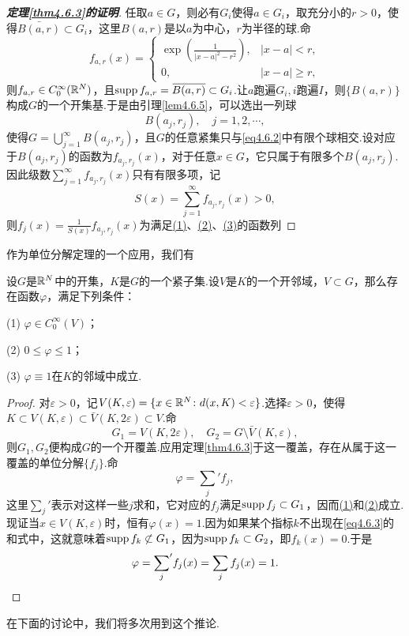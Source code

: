 \begin{proof}[\textbf{定理\ref{thm4.6.3}的证明}]
	任取$a\in G$，则必有$G_i$使得$a\in G_i$，取充分小的$r>0$，使得$\bar{B(a,r)}\subset G_i$，这里$B(a,r)$是以$a$为中心，$r$为半径的球.命
	\[f_{a,r}(x)=\begin{cases}
		\exp\left(\frac1{|x-a|^2-r^2}\right), & |x-a|<r,\\
		0, & |x-a|\ge r,
	\end{cases}\]
则$f_{a,r}\in C_0^\infty(\mathbb R^N)$，且$\operatorname{supp} f_{a,r}={}\mkern1mu\overline{\mkern-1muB(a,r)}\subset G_i$.让$a$跑遍$G_i,i$跑遍$I$，则$\{B(a,r)\}$构成$G$的一个开集基.于是由引理\ref{lem4.6.5}，可以选出一列球
\begin{equation}\label{eq4.6.2}
	B(a_j,r_j),\quad j=1,2,\cdots,
\end{equation}
使得$G=\bigcup\limits_{j=1}^\infty B(a_j,r_j)$，且$G$的任意紧集只与\eqref{eq4.6.2}中有限个球相交.设对应于$B(a_j,r_j)$的函数为$f_{a_j,r_j}(x)$，对于任意$x\in G$，它只属于有限多个$B(a_j,r_j)$.因此级数$\sum\limits_{j=1}^\infty f_{a_j,r_j}(x)$只有有限多项，记
\[S(x)=\sum_{j=1}^{\infty}f_{a_j,r_j}(x)>0,\]
则$f_j(x)=\frac1{S(x)}f_{a_j,r_j}(x)$为满足\hyperlink{4.6.3}{(1)}、\hyperlink{4.6.3}{(2)}、\hyperlink{4.6.3}{(3)}的函数列
\end{proof}
作为单位分解定理的一个应用，我们有
\begin{corollary}\label{cor4.6.6}
	设$G$是$\mathbb R^N$中的开集，$K$是$G$的一个紧子集.设$V$是$K$的一个开邻域，$V\subset G$，那么存在函数$\varphi$，满足下列条件：
	
	(1)\hypertarget{4.6.6}{}
	$\varphi\in C_0^\infty(V)$；
	
	(2)\hypertarget{4.6.6}{}
	$0\le\varphi\le1$；
	
	(3)\hypertarget{4.6.6}{}
	$\varphi\equiv1$在$K$的邻域中成立.
\end{corollary}
\begin{proof}
	对$\varepsilon>0$，记$V(K,\varepsilon)=\{x\in\mathbb R^N\colon d(x,K)<\varepsilon\}$.选择$\varepsilon>0$，使得$K\subset V(K,\varepsilon)\subset\bar{V}(K,2\varepsilon)\subset V$.命
	\[G_1=V(K,2\varepsilon),\quad G_2=G\setminus\bar{V}(K,\varepsilon),\]
	则$G_1,G_2$便构成$G$的一个开覆盖.应用定理\ref{thm4.6.3}于这一覆盖，存在从属于这一覆盖的单位分解$\{f_j\}$.命
	\begin{equation}\label{eq4.6.3}
		\varphi={\sum_j}'f_j,
	\end{equation}
这里${\sum\limits_{j}}'$表示对这样一些$j$求和，它对应的$f_j$满足$\operatorname{supp} f_j\subset G_1$，因而\hyperlink{4.6.6}{(1)}和\hyperlink{4.6.6}{(2)}成立.现证当$x\in V(K,\varepsilon)$时，恒有$\varphi(x)=1$.因为如果某个指标$k$不出现在\eqref{eq4.6.3}的和式中，这就意味着$\operatorname{supp} f_k\not\subset G_1$，因为$\operatorname{supp} f_k\subset G_2$，即$f_k(x)=0$.于是
\[\varphi={\sum_j}'f_j(x)=\sum_j f_j(x)=1.\qedhere\]
\end{proof}
在下面的讨论中，我们将多次用到这个推论.

